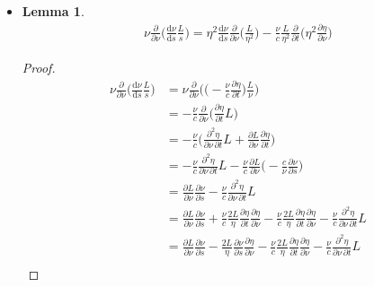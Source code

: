 \documentclass[10pt]{article}
\newtheorem{lemma}{Lemma}[section]
\newcommand{\dee}{\mathrm{d}}
\begin{document}
\begin{itemize}
    \item \begin{lemma}
      \begin{align*}
        \nu \frac{\partial }{\partial \nu} \bigg( \frac{\dee \nu}{\dee s} \frac{L}{s} \bigg)
        = \eta^2 \frac{\dee \nu}{\dee s} \frac{\partial }{\partial \nu} \bigg( \frac{L}{\eta^2} \bigg)
        - \frac{\nu}{c} \frac{L}{\eta^2} \frac{\partial }{\partial t} \bigg( \eta^2 \frac{\partial \eta}{\partial \nu} \bigg) 
      \end{align*}      
    \end{lemma}
    \begin{proof}
      \begin{align*}
        \nu \frac{\partial }{\partial \nu} \bigg( \frac{\dee \nu}{\dee s} \frac{L}{s} \bigg)
        &= \nu \frac{\partial }{\partial \nu} \bigg( \bigg( -\frac{\nu}{c} \frac{\partial \eta}{\partial t} \bigg) \frac{L}{\nu} \bigg) \\
        &= - \frac{\nu}{c} \frac{\partial }{\partial \nu} \bigg( \frac{\partial \eta}{\partial t} L \bigg) \\
        &= - \frac{\nu}{c} \bigg( \frac{\partial^2 \eta}{\partial \nu \, \partial t} L + \frac{\partial L}{\partial \nu} \frac{\partial \eta}{\partial t} \bigg) \\
        &= - \frac{\nu}{c} \frac{\partial^2 \eta}{\partial \nu \, \partial t} L 
        - \frac{\nu}{c} \frac{\partial L}{\partial \nu} \bigg( - \frac{c}{\nu} \frac{\partial \nu}{\partial s} \bigg) \\
        &= \frac{\partial L}{\partial \nu} \frac{\partial \nu}{\partial s}
        - \frac{\nu}{c} \frac{\partial^2 \eta}{\partial \nu \, \partial t} L \\
        &= \frac{\partial L}{\partial \nu} \frac{\partial \nu}{\partial s}
        + \frac{\nu}{c} \frac{2L}{\eta} \frac{\partial \eta}{\partial t} \frac{\partial \eta}{\partial \nu} 
        - \frac{\nu}{c} \frac{2L}{\eta} \frac{\partial \eta}{\partial t} \frac{\partial \eta}{\partial \nu} 
        - \frac{\nu}{c} \frac{\partial^2 \eta}{\partial \nu \, \partial t} L \\
        &= \frac{\partial L}{\partial \nu} \frac{\partial \nu}{\partial s}
        - \frac{2L}{\eta} \frac{\partial \nu}{\partial s} \frac{\partial \eta}{\partial \nu} 
        - \frac{\nu}{c} \frac{2L}{\eta} \frac{\partial \eta}{\partial t} \frac{\partial \eta}{\partial \nu} 
        - \frac{\nu}{c} \frac{\partial^2 \eta}{\partial \nu \, \partial t} L \\

\end{align*}
\end{proof}
\end{itemize}
\end{document}
